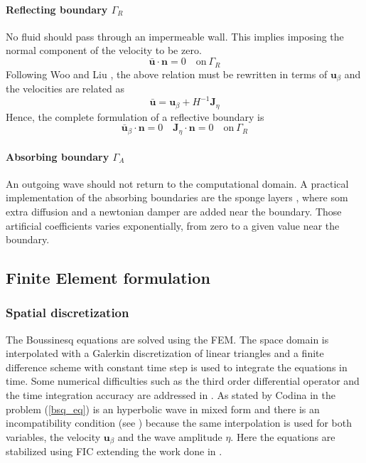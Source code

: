 \paragraph{Reflecting boundary $\Gamma_R$} No fluid should pass through an impermeable wall. This implies imposing the normal component of the velocity to be zero.
\begin{equation*}
    \bar{\mathbf{u}} \cdot \mathbf{n} = 0 \quad \text{on} \ \Gamma_R
\end{equation*}
Following Woo and Liu \cite{woo2004a}, the above relation must be rewritten in terms of $\mathbf{u}_\beta$ and the velocities are related as
\begin{equation*}
    \bar{\mathbf{u}} = \mathbf{u}_\beta + H^{-1} \mathbf{J}_\eta
\end{equation*}
Hence, the complete formulation of a reflective boundary is
\begin{equation}
    \bar{\mathbf{u}}_\beta \cdot \mathbf{n} = 0 \quad
    \mathbf{J}_\eta \cdot \mathbf{n} = 0 \quad
    \text{on} \ \Gamma_R
\end{equation}

\paragraph{Absorbing boundary $\Gamma_A$} An outgoing wave should not return to the computational domain. A practical implementation of the absorbing boundaries are the sponge layers \cite{israeli1981, wei1995}, where som extra diffusion and a newtonian damper are added near the boundary. Those artificial coefficients varies exponentially, from zero to a given value near the boundary.



\subsection{Finite Element formulation}

\subsubsection{Spatial discretization}

The Boussinesq equations are solved using the FEM. The space domain is interpolated with a Galerkin discretization of linear triangles and a finite difference scheme with constant time step is used to integrate the equations in time.
Some numerical difficulties such as the third order differential operator and the time integration accuracy are addressed in \cite{walkley2002,woo2004a,wei1995}.
As stated by Codina in \cite{codina2008,codina2008b} the problem (\ref{bsq_eq}) is an hyperbolic wave in mixed form and there is an incompatibility condition (see \cite{BrezziFortin}) because the same interpolation is used for both variables, the velocity $\mathbf{u}_\beta$ and the wave amplitude $\eta$.
Here the equations are stabilized using FIC extending the work done in \cite{maso2022}.


